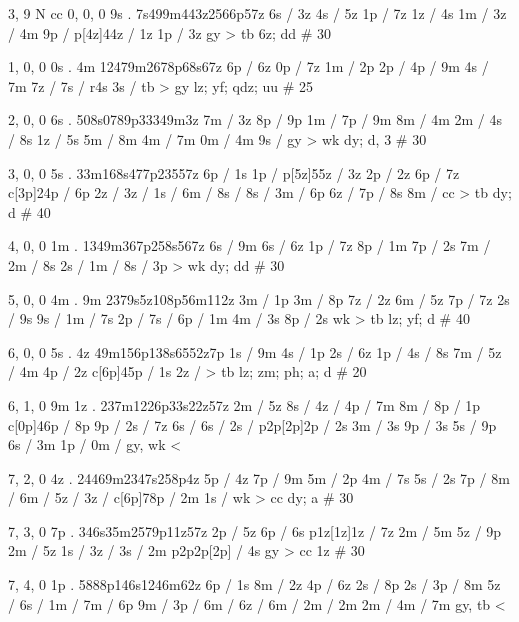3, 9
N
cc
0, 0, 0
9s . 
7s499m443z2566p57z
6s / 3z 
4s / 5z 
1p / 7z 
1z / 4s 
1m / 
3z / 4m 
9p / 
p[4z]44z / 1z 
1p / 3z 
gy > tb 
6z; dd # 30 

1, 0, 0
0s . 4m 
12479m2678p68s67z 
6p / 6z 
0p / 7z 
1m / 2p 
2p / 
4p / 9m 
4s / 7m 
7z / 
7s / r4s 
3s / 
tb > gy 
lz; yf; qdz; uu # 25

2, 0, 0 
6s .
508s0789p33349m3z 
7m / 3z 
8p / 9p 
1m / 
7p / 9m 
8m / 4m 
2m / 
4s / 8s 
1z / 5s 
5m / 8m 
4m / 7m 
0m / 4m 
9s /  
gy > wk
dy; d, 3 # 30 

3, 0, 0
5s .
33m168s477p23557z 
6p / 1s 
1p / 
p[5z]55z / 3z 
2p / 2z 
6p / 7z 
c[3p]24p / 6p 
2z / 
3z / 
1s / 
6m / 
8s / 
8s / 
3m / 6p 
6z / 
7p / 8s 
8m / 
cc > tb 
dy; d # 40 

4, 0, 0 
1m . 
1349m367p258s567z 
6s / 9m 
6s / 6z 
1p / 7z 
8p / 1m 
7p / 2s 
7m / 
2m / 8s 
2s / 
1m / 
8s / 3p 
> wk 
dy; dd # 30 

5, 0, 0 
4m . 9m 
2379s5z108p56m112z 
3m / 1p 
3m / 8p 
7z / 2z 
6m / 5z 
7p / 7z 
2s / 9s 
9s / 
1m / 7s 
2p / 
7s / 
6p / 1m 
4m / 3s 
8p / 2s 
wk > tb 
lz; yf; d # 40 

6, 0, 0
5s . 4z 
49m156p138s6552z7p 
1s / 9m 
4s / 1p 
2s / 6z 
1p / 
4s / 8s 
7m / 
5z / 4m 
4p / 2z
c[6p]45p / 1s 
2z / 
> tb 
lz; zm; ph; a; d # 20 

6, 1, 0 
9m 1z . 
237m1226p33s22z57z 
2m / 5z 
8s / 
4z / 
4p / 7m 
8m / 
8p / 1p 
c[0p]46p / 8p 
9p / 
2s / 7z 
6s / 
6s / 
2s / 
p2p[2p]2p / 2s 
3m / 3s 
9p / 3s 
5s / 9p 
6s / 3m 
1p / 
0m / 
gy, wk < 

7, 2, 0
4z . 
24469m2347s258p4z 
5p / 4z 
7p / 9m 
5m / 2p 
4m / 7s 
5s / 2s 
7p / 
8m / 
6m / 
5z / 
3z / 
c[6p]78p / 2m 
1s / 
wk > cc 
dy; a # 30 

7, 3, 0 
7p . 
346s35m2579p11z57z 
2p / 5z 
6p / 6s 
p1z[1z]1z / 7z 
2m / 5m 
5z / 9p 
2m / 5z 
1s / 
3z / 
3s / 2m 
p2p2p[2p] / 4s 
gy > cc 
1z # 30 

7, 4, 0 
1p . 
5888p146s1246m62z 
6p / 1s 
8m / 2z 
4p / 6z 
2s / 8p 
2s / 
3p / 8m 
5z / 
6s / 
1m / 
7m / 6p 
9m / 
3p / 
6m / 
6z / 
6m / 
2m / 2m 
2m / 
4m / 7m 
gy, tb <
